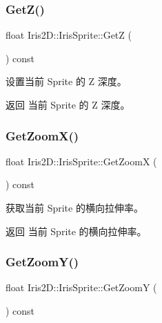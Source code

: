\subsubsection{\texorpdfstring{Get\+Z()}{GetZ()}}
{\footnotesize\ttfamily float Iris2\+D\+::\+Iris\+Sprite\+::\+GetZ (\begin{DoxyParamCaption}{ }\end{DoxyParamCaption}) const}



设置当前 Sprite 的 Z 深度。 

\begin{DoxyReturn}{返回}
当前 Sprite 的 Z 深度。 
\end{DoxyReturn}
\mbox{\label{class_iris2_d_1_1_iris_sprite_a1cb9fb2549f00ef1efab204f0d222aeb}} 
\subsubsection{\texorpdfstring{Get\+Zoom\+X()}{GetZoomX()}}
{\footnotesize\ttfamily float Iris2\+D\+::\+Iris\+Sprite\+::\+Get\+ZoomX (\begin{DoxyParamCaption}{ }\end{DoxyParamCaption}) const}



获取当前 Sprite 的横向拉伸率。 

\begin{DoxyReturn}{返回}
当前 Sprite 的横向拉伸率。 
\end{DoxyReturn}
\mbox{\label{class_iris2_d_1_1_iris_sprite_a350aab21a9e40f7d26b8d757d26e4df2}} 
\subsubsection{\texorpdfstring{Get\+Zoom\+Y()}{GetZoomY()}}
{\footnotesize\ttfamily float Iris2\+D\+::\+Iris\+Sprite\+::\+Get\+ZoomY (\begin{DoxyParamCaption}{ }\end{DoxyParamCaption}) const}



